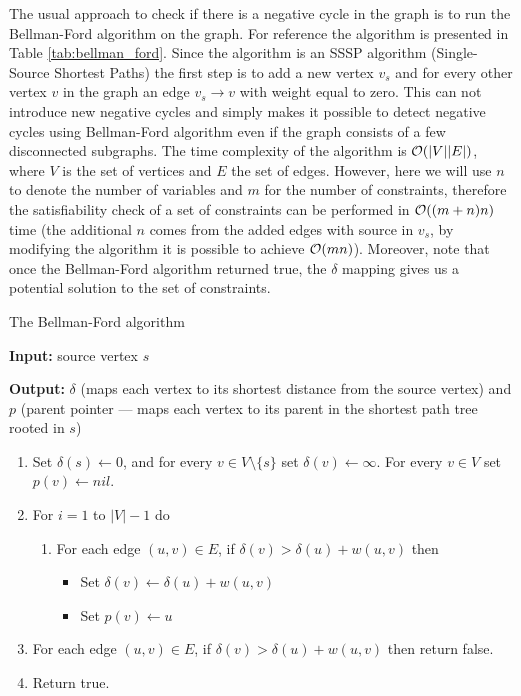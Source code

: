 The usual approach to check if there is a negative cycle in the graph is to run
the Bellman-Ford algorithm on the graph. For reference the algorithm is
presented in Table \ref{tab:bellman_ford}. Since the algorithm is an SSSP
algorithm (Single-Source Shortest Paths) the first step is to add a new vertex
$v_s$ and for every other vertex $v$ in the graph an edge $v_s \rightarrow v$
with weight equal to zero. This can not introduce new negative cycles and simply
makes it possible to detect negative cycles using Bellman-Ford algorithm even if
the graph consists of a few disconnected subgraphs. The time complexity of the
algorithm is $\mathcal{O}(|V| |E|)$, where $V$ is the set of vertices and
$E$ the set of edges. However, here we will use $n$ to denote the number of
variables and $m$ for the number of constraints, therefore the satisfiability
check of a set of constraints can be performed in $\mathcal{O}((m + n) n)$ time
(the additional $n$ comes from the added edges with source in $v_s$, by
modifying the algorithm it is possible to achieve $\mathcal{O}(m n)$).
Moreover, note that once the Bellman-Ford algorithm returned true, the $\delta$
mapping gives us a potential solution to the set of constraints.

\begin{table}
\caption{The Bellman-Ford algorithm}
\label{tab:bellman_ford}
\textbf{Input:} source vertex $s$

\textbf{Output:} $\delta$ (maps each vertex to its shortest distance from the
  source vertex) and $p$ (parent pointer --- maps each vertex to its parent in
  the shortest path tree rooted in $s$)

\begin{enumerate}
\item Set $\delta(s) \leftarrow 0$, and
  for every $v \in V \setminus \{ s \}$ set $\delta(v) \leftarrow \infty$.
  For every $v \in V$ set $p(v) \leftarrow nil$.
%
\item For $i = 1$ to $|V| -1$ do
  \begin{enumerate}
  \item For each edge $(u, v) \in E$, if $\delta(v) > \delta(u) + w(u, v)$ then
    \begin{itemize}
    \item Set $\delta(v) \leftarrow \delta(u) + w(u, v)$
    \item Set $p(v) \leftarrow u$
    \end{itemize}
  \end{enumerate}
%
\item For each edge $(u, v) \in E$, if $\delta(v) > \delta(u) + w(u, v)$ then
  return false.
%
\item Return true.
\end{enumerate}
\end{table}


